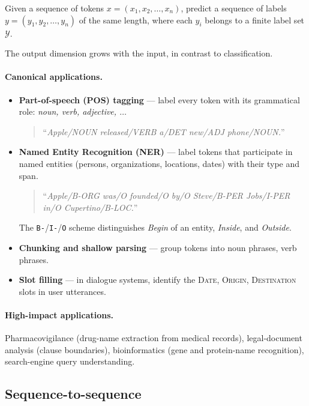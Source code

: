 \begin{definition}
Given a sequence of tokens $x = (x_1, x_2, \dots, x_n)$, predict a sequence of labels $y = (y_1, y_2, \dots, y_n)$ of the same length, where each $y_i$ belongs to a finite label set $\mathcal{Y}$.
\end{definition}

The output dimension grows with the input, in contrast to classification.

\paragraph{Canonical applications.}
\begin{itemize}
    \item \textbf{Part-of-speech (POS) tagging} --- label every token with its grammatical role: \emph{noun, verb, adjective, $\ldots$}
    \begin{quote}
    ``\emph{Apple/NOUN released/VERB a/DET new/ADJ phone/NOUN.}''
    \end{quote}
    \item \textbf{Named Entity Recognition (NER)} --- label tokens that participate in named entities (persons, organizations, locations, dates) with their type and span.
    \begin{quote}
    ``\emph{Apple/B-ORG was/O founded/O by/O Steve/B-PER Jobs/I-PER in/O Cupertino/B-LOC.}''
    \end{quote}
    The \texttt{B-}/\texttt{I-}/\texttt{O} scheme distinguishes \emph{Begin} of an entity, \emph{Inside}, and \emph{Outside}.
    \item \textbf{Chunking and shallow parsing} --- group tokens into noun phrases, verb phrases.
    \item \textbf{Slot filling} --- in dialogue systems, identify the \textsc{Date}, \textsc{Origin}, \textsc{Destination} slots in user utterances.
\end{itemize}

\paragraph{High-impact applications.} Pharmacovigilance (drug-name extraction from medical records), legal-document analysis (clause boundaries), bioinformatics (gene and protein-name recognition), search-engine query understanding.

\subsection{Sequence-to-sequence}

